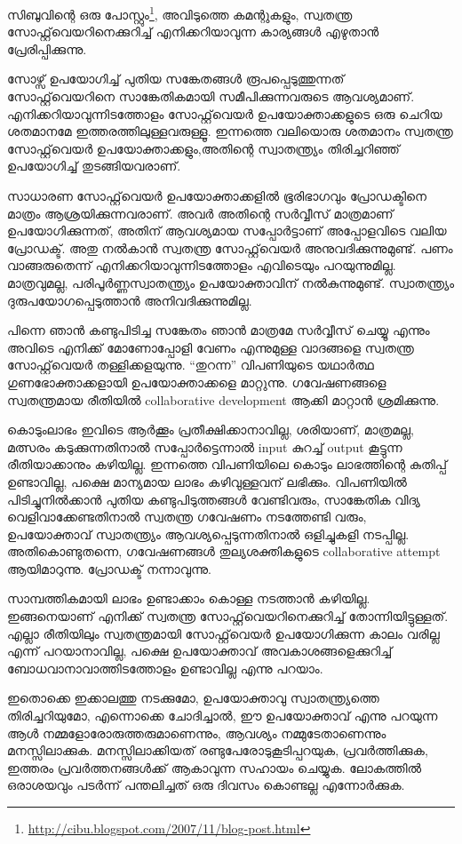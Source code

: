 \vskip 2pt

സിബുവിന്റെ ഒരു പോസ്റ്റും\footnote{\url{http://cibu.blogspot.com/2007/11/blog-post.html}}, അവിടുത്തെ കമന്റുകളും, സ്വതന്ത്ര സോഫ്റ്റ്‌വെയറിനെക്കുറിച്ച് എനിക്കറിയാവുന്ന കാര്യങ്ങള്‍ എഴുതാന്‍ പ്രേരിപ്പിക്കുന്നു.

സോഴ്സ് ഉപയോഗിച്ച് പുതിയ സങ്കേതങ്ങള്‍ രൂപപ്പെടുത്തുന്നത് സോഫ്റ്റ്‌വെയറിനെ സാങ്കേതികമായി സമീപിക്കുന്നവരുടെ ആവശ്യമാണ്. എനിക്കറിയാവുന്നിടത്തോളം സോഫ്റ്റ്‌വെയര്‍ ഉപയോക്താക്കളുടെ ഒരു ചെറിയ ശതമാനമേ ഇത്തരത്തിലുള്ളവരുള്ളൂ. ഇന്നത്തെ വലിയൊരു ശതമാനം സ്വതന്ത്ര സോഫ്റ്റ്‌വെയര്‍ ഉപയോക്താക്കളും,അതിന്റെ സ്വാതന്ത്ര്യം തിരിച്ചറിഞ്ഞ് ഉപയോഗിച്ച് തുടങ്ങിയവരാണ്.

സാധാരണ സോഫ്റ്റ്‌വെയര്‍ ഉപയോക്താക്കളില്‍ ഭൂരിഭാഗവും പ്രോഡക്ടിനെ മാത്രം ആശ്രയിക്കുന്നവരാണ്. അവര്‍ അതിന്റെ സര്‍വ്വീസ് മാത്രമാണ് ഉപയോഗിക്കുന്നത്, അതിന് ആവശ്യമായ സപ്പോര്‍ട്ടാണ് അപ്പോളവിടെ വലിയ പ്രോഡക്ട്. അതു നല്‍കാന്‍ സ്വതന്ത്ര സോഫ്റ്റ്‌വെയര്‍ അനുവദിക്കുന്നുമുണ്ട്. പണം വാങ്ങരുതെന്ന് എനിക്കറിയാവുന്നിടത്തോളം എവിടെയും പറയുന്നുമില്ല. മാത്രവുമല്ല, പരിപൂര്‍ണ്ണസ്വാതന്ത്ര്യം ഉപയോക്താവിന് നല്‍കുന്നുമുണ്ട്. സ്വാതന്ത്ര്യം ദുരുപയോഗപ്പെടുത്താന്‍ അനിവദിക്കുന്നുമില്ല.

പിന്നെ ഞാന്‍ കണ്ടുപിടിച്ച സങ്കേതം ഞാന്‍ മാത്രമേ സര്‍വ്വീസ് ചെയ്യൂ എന്നും അവിടെ എനിക്ക് മോണോപ്പോളി വേണം എന്നുമുള്ള വാദങ്ങളെ സ്വതന്ത്ര സോഫ്റ്റ്‌വെയര്‍ തള്ളിക്കളയുന്നു. “തുറന്ന” വിപണിയുടെ യഥാര്‍ത്ഥ ഗുണഭോക്താക്കളായി ഉപയോക്താക്കളെ മാറ്റുന്നു. ഗവേഷണങ്ങളെ സ്വതന്ത്രമായ രീതിയില്‍ collaborative development ആക്കി മാറ്റാന്‍ ശ്രമിക്കുന്നു.

കൊടുംലാഭം ഇവിടെ ആര്‍ക്കൂം പ്രതീക്ഷിക്കാനാവില്ല, ശരിയാണ്, മാത്രമല്ല, മത്സരം കടുക്കുന്നതിനാല്‍ സപ്പോര്‍ട്ടെന്നാല്‍ input കുറച്ച് output കൂട്ടുന്ന രീതിയാക്കാനും കഴിയില്ല. ഇന്നത്തെ വിപണിയിലെ കൊടും ലാഭത്തിന്റെ കുതിപ്പ് ഉണ്ടാവില്ല, പക്ഷെ മാന്യമായ ലാഭം കഴിവുള്ളവന് ലഭിക്കും. വിപണിയില്‍ പിടിച്ചുനില്‍ക്കാന്‍ പുതിയ കണ്ടുപിടുത്തങ്ങള്‍ വേണ്ടിവരും, സാങ്കേതിക വിദ്യ വെളിവാക്കേണ്ടതിനാല്‍ സ്വതന്ത്ര ഗവേഷണം നടത്തേണ്ടി വരും, ഉപയോക്താവ് സ്വാതന്ത്ര്യം ആവശ്യപ്പെടുന്നതിനാല്‍ ഒളിച്ചുകളി നടപ്പില്ല. അതികൊണ്ടുതന്നെ, ഗവേഷണങ്ങള്‍ തുല്യശക്തികളുടെ collaborative attempt ആയിമാറുന്നു. പ്രോഡക്ട് നന്നാവുന്നു.

സാമ്പത്തികമായി ലാഭം ഉണ്ടാക്കാം കൊള്ള നടത്താന്‍ കഴിയില്ല. ഇങ്ങനെയാണ് എനിക്ക് സ്വതന്ത്ര സോഫ്റ്റ്‌വെയറിനെക്കുറിച്ച് തോന്നിയിട്ടുള്ളത്. എല്ലാ രീതിയിലും സ്വതന്ത്രമായി സോഫ്റ്റ്‌‌വെയര്‍ ഉപയോഗിക്കുന്ന കാലം വരില്ല എന്ന് പറയാനാവില്ല, പക്ഷെ ഉപയോക്താവ് അവകാശങ്ങളെക്കുറിച്ച് ബോധവാനാവാത്തിടത്തോളം ഉണ്ടാവില്ല എന്നു പറയാം.

ഇതൊക്കെ ഇക്കാലത്തു നടക്കുമോ, ഉപയോക്താവു സ്വാതന്ത്ര്യത്തെ തിരിച്ചറിയുമോ, എന്നൊക്കെ ചോദിച്ചാല്‍, ഈ ഉപയോക്താവ് എന്നു പറയുന്ന ആള്‍ നമ്മളോരോരുത്തരുമാണെന്നും, ആവശ്യം നമ്മുടേതാണെന്നും മനസ്സിലാക്കുക. മനസ്സിലാക്കിയത് രണ്ടുപേരോടുകൂടിപ്പറയുക, പ്രവര്‍ത്തിക്കുക, ഇത്തരം പ്രവര്‍ത്തനങ്ങള്‍ക്ക് ആകാവുന്ന സഹായം ചെയ്യുക. ലോകത്തില്‍ ഒരാശയവും പടര്‍ന്ന് പന്തലിച്ചത് ഒരു ദിവസം കൊണ്ടല്ല എന്നോര്‍ക്കുക.

